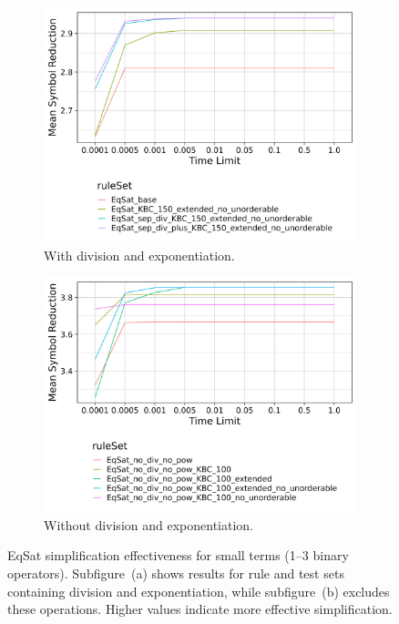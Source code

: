 \begin{figure}[h]
	\centering
	\begin{subfigure}[t]{0.48\textwidth}
		\includegraphics[width=\linewidth]{img/by_rule_set_random_terms_small.png}
		\caption{With division and exponentiation.}
		\label{fig:eqsat_small_with_div}
	\end{subfigure}\hfill
	\begin{subfigure}[t]{0.48\textwidth}
		\includegraphics[width=\linewidth]{img/by_rule_set_no_div_no_pow_random_terms_small.png}
		\caption{Without division and exponentiation.}
		\label{fig:eqsat_small_no_div}
	\end{subfigure}
	\caption{
		EqSat simplification effectiveness for small terms (1–3 binary operators).
		Subfigure~(a) shows results for rule and test sets containing division and exponentiation, 
		while subfigure~(b) excludes these operations.
		Higher values indicate more effective simplification.
	}
	\label{fig:eqsat_small_comparison}
\end{figure}


